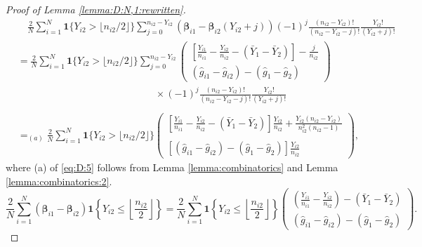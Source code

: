 \documentclass[12pt,letterpaper]{article}
\begin{document}
\begin{proof}[Proof of Lemma \ref{lemma:D:N,1:rewritten}]
\begin{equation}\label{eq:D:5}
\begin{array}{rl}
&\displaystyle\quad\frac{2}{N}\sum_{i=1}^N\mathbf{1}\{Y_{i2} > \lfloor n_{i2}/2\rfloor\}\!\!\!\sum_{j=0}^{n_{i2}-Y_{i2}}\!\!\!(\boldsymbol{\beta}_{i1}-\boldsymbol{\beta}_{i2}(Y_{i2}+j))(-1)^{j}\frac{(n_{i2}-Y_{i2})!}{(n_{i2}-Y_{i2}-j)!}\frac{Y_{i2}!}{(Y_{i2}+j)!}\\
&\displaystyle=\frac{2}{N}\sum_{i=1}^N\mathbf{1}\{Y_{i2} > \lfloor n_{i2}/2\rfloor\}\!\!\!\sum_{j=0}^{n_{i2}-Y_{i2}}\!\!\!\begin{pmatrix}
\displaystyle\left[\frac{Y_{i1}}{n_{i1}}-\frac{Y_{i2}}{n_{i2}}-(\bar{Y}_1-\bar{Y}_2)\right]-\frac{j}{n_{i2}}\\
(\hat{g}_{i1}-\hat{g}_{i2})-(\hat{g}_1-\hat{g}_2)
\end{pmatrix}\\
&\quad\quad\quad\quad\quad\quad\quad\quad\quad\quad\quad\quad\quad\quad\displaystyle\times(-1)^{j}\frac{(n_{i2}-Y_{i2})!}{(n_{i2}-Y_{i2}-j)!}\frac{Y_{i2}!}{(Y_{i2}+j)!}\\
\\
&\displaystyle=_{(a)}\frac{2}{N}\sum_{i=1}^N\mathbf{1}\{Y_{i2} > \lfloor n_{i2}/2\rfloor\}\begin{pmatrix}
\displaystyle\left[\frac{Y_{i1}}{n_{i1}}-\frac{Y_{i2}}{n_{i2}}-(\bar{Y}_1-\bar{Y}_2)\right]\frac{Y_{i2}}{n_{i2}}+\frac{Y_{i2}(n_{i2}-Y_{i2})}{n_{i2}^2(n_{i2}-1)}\\
\\
\displaystyle[(\hat{g}_{i1}-\hat{g}_{i2})-(\hat{g}_1-\hat{g}_2)]\frac{Y_{i2}}{n_{i2}}
\end{pmatrix},
\end{array}
\end{equation}
where (a) of \eqref{eq:D:5} follows from Lemma \ref{lemma:combinatorics} and Lemma \ref{lemma:combinatorics:2}. 
\begin{equation}\label{eq:D:6}
\frac{2}{N}\sum_{i=1}^N(\boldsymbol{\beta}_{i1}-\boldsymbol{\beta}_{i2})\mathbf{1}\left\{Y_{i2}\leq\left\lfloor \frac{n_{i2}}{2}\right\rfloor\right\}=\frac{2}{N}\sum_{i=1}^N\mathbf{1}\left\{Y_{i2}\leq\left\lfloor\frac{n_{i2}}{2}\right\rfloor\right\}\begin{pmatrix}
\displaystyle\left(\frac{Y_{i1}}{n_{i1}}-\frac{Y_{i2}}{n_{i2}}\right)-(\bar{Y}_1-\bar{Y}_2)\\
\displaystyle(\hat{g}_{i1}-\hat{g}_{i2})-(\hat{g}_1-\hat{g}_2)
\end{pmatrix}.
\end{equation}

\end{proof}
\end{document}
